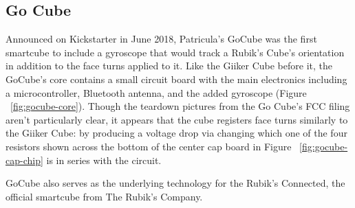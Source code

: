 \subsection{Go Cube}
Announced on Kickstarter in June 2018, Patricula's GoCube was the first smartcube to include a gyroscope that would track a Rubik's Cube's orientation in addition to the face turns applied to it. \cite{gocube-product-launch-video}
Like the Giiker Cube before it, the GoCube's core contains a small circuit board with the main electronics including a microcontroller, Bluetooth antenna, and the added gyroscope (Figure ~\ref{fig:gocube-core}). 
Though the teardown pictures from the Go Cube's FCC filing aren't particularly clear, it appears that the cube registers face turns similarly to the Giiker Cube: by producing a voltage drop via changing which one of the four resistors shown across the bottom of the center cap board in Figure ~\ref{fig:gocube-cap-chip} is in series with the circuit.

GoCube also serves as the underlying technology for the Rubik's Connected, the official smartcube from The Rubik's Company. \cite{gocube-rubiksconnected}

